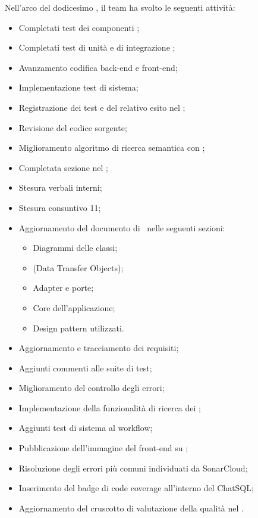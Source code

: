 Nell'arco del dodicesimo , il team ha svolto le seguenti attività:
\begin{itemize}
  \item Completati test dei componenti ;
  \item Completati test di unità e di integrazione ;
  \item Avanzamento codifica back-end e front-end;
  \item Implementazione test di sistema;
  \item Registrazione dei test e del relativo esito nel \PdQ;
  \item Revisione del codice sorgente;
  \item Miglioramento algoritmo di ricerca semantica con ;
  \item Completata sezione  nel \MU;
  \item Stesura verbali interni;
  \item Stesura consuntivo  11;
  \item Aggiornamento del documento di \ST\ nelle seguenti sezioni:
  \begin{itemize}
    \item Diagrammi delle classi;
    \item {} (Data Transfer Objects);
    \item Adapter e porte;
    \item Core dell'applicazione;
    \item Design pattern utilizzati.
  \end{itemize}
  \item Aggiornamento e tracciamento dei requisiti;
  \item Aggiunti commenti alle suite di test;
  \item Miglioramento del controllo degli errori;
  \item Implementazione della funzionalità di ricerca dei ;
  \item Aggiunti test di sistema al workflow;
  \item Pubblicazione dell'immagine  del front-end su ;
  \item Risoluzione degli errori più comuni individuati da SonarCloud;
  \item Inserimento del badge di code coverage all'interno del  ChatSQL;
  \item Aggiornamento del cruscotto di valutazione della qualità nel \PdQ.
\end{itemize}

